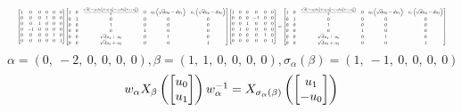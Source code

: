 \documentclass[11pt]{article}
\theoremstyle{definition}
\begin{document}
\[
\scaletoalign{\textwidth}{{\left[\begin{matrix}1 & 0 & 0 & 0 & 0 & 0\\0 & 0 & 0 & 1 & 0 & 0\\0 & 0 & 1 & 0 & 0 & 0\\0 & -1 & 0 & 0 & 0 & 0\\0 & 0 & 0 & 0 & 1 & 0\\0 & 0 & 0 & 0 & 0 & 1\end{matrix}\right]} {\left[\begin{matrix}1 & 0 & \frac{\sqrt{d} \left(- c_{0} d u_{1}^{2} + c_{0} u_{0}^{2} - c_{1} d u_{3}^{2} + c_{1} u_{2}^{2}\right)}{2} & 0 & c_{0} \left(\sqrt{d} u_{0} - d u_{1}\right) & c_{1} \left(\sqrt{d} u_{2} - d u_{3}\right)\\0 & 1 & 0 & 0 & 0 & 0\\0 & 0 & 1 & 0 & 0 & 0\\0 & 0 & 0 & 1 & 0 & 0\\0 & 0 & \sqrt{d} u_{1} + u_{0} & 0 & 1 & 0\\0 & 0 & \sqrt{d} u_{3} + u_{2} & 0 & 0 & 1\end{matrix}\right]} {\left[\begin{matrix}1 & 0 & 0 & 0 & 0 & 0\\0 & 0 & 0 & -1 & 0 & 0\\0 & 0 & 1 & 0 & 0 & 0\\0 & 1 & 0 & 0 & 0 & 0\\0 & 0 & 0 & 0 & 1 & 0\\0 & 0 & 0 & 0 & 0 & 1\end{matrix}\right]} = {\left[\begin{matrix}1 & 0 & \frac{\sqrt{d} \left(- c_{0} d u_{1}^{2} + c_{0} u_{0}^{2} - c_{1} d u_{3}^{2} + c_{1} u_{2}^{2}\right)}{2} & 0 & c_{0} \left(\sqrt{d} u_{0} - d u_{1}\right) & c_{1} \left(\sqrt{d} u_{2} - d u_{3}\right)\\0 & 1 & 0 & 0 & 0 & 0\\0 & 0 & 1 & 0 & 0 & 0\\0 & 0 & 0 & 1 & 0 & 0\\0 & 0 & \sqrt{d} u_{1} + u_{0} & 0 & 1 & 0\\0 & 0 & \sqrt{d} u_{3} + u_{2} & 0 & 0 & 1\end{matrix}\right]}}
\]
\[
\alpha = \left( 0, \  -2, \  0, \  0, \  0, \  0\right), \beta = \left( 1, \  1, \  0, \  0, \  0, \  0\right), \sigma_{\alpha}(\beta) = \left( 1, \  -1, \  0, \  0, \  0, \  0\right)
\]
\[
\scaletoalign{\textwidth}{w_{\alpha} X_{\beta}\left(\left[\begin{matrix}u_{0}\\u_{1}\end{matrix}\right]\right) w_{\alpha}^{-1} = X_{\sigma_{\alpha}\left(\beta\right)}\left(\left[\begin{matrix}u_{1}\\- u_{0}\end{matrix}\right]\right)}
\]
\end{document}
